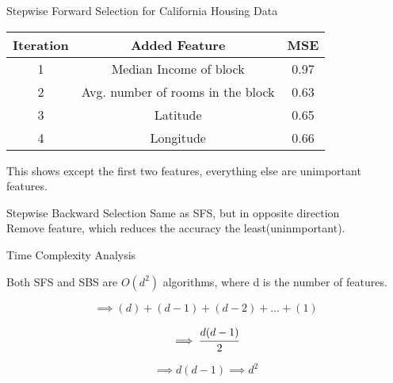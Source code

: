 \documentclass{beamer}
\begin{document}
\begin{frame}{Stepwise Forward Selection for California Housing Data }
\begin{center}

	\begin{tabular}{|c|c|c|}
	\hline
	\textbf{Iteration}&	\textbf{Added Feature}	&\textbf{MSE}\\
	\hline
	\hline
	1&Median Income of block&0.97\\
	2&Avg. number  of rooms in the block&0.63\\
	3&Latitude&0.65\\
	4&Longitude&0.66\\
	\hline

	\end{tabular}

\end{center}

	This shows except the first two features, everything else are unimportant features.
\end{frame}

\begin{frame}{Stepwise Backward Selection}
    Same as SFS, but in opposite direction\\
    Remove feature, which reduces the accuracy the least(uninmportant).
\end{frame}

\begin{frame}{Time Complexity Analysis}
    
    Both SFS and SBS are $O(d^2)$ algorithms, where d is the number of features.
    
     \begin{equation*}
         \implies (d) + (d-1) + (d-2) + \dots + (1)
           \end{equation*}
     
     \begin{equation*}
          \implies \cfrac{d(d-1)}{2}
            \end{equation*}
     
     \begin{equation*}
         \implies d(d-1)  \implies d^{2}
           \end{equation*}
\end{frame}
\end{document}
